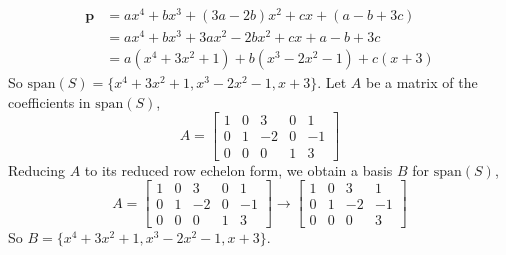 \documentclass{article}
\theoremstyle{definition}
\begin{document}
    \begin{prob}{19} $  $
    	\begin{align*}
    		\mathbf{p} &= ax^4 + bx^3 + (3a-2b)x^2 + cx + (a-b+3c) \\
    		&= ax^4 + bx^3 + 3ax^2 - 2bx^2 + cx + a - b + 3c \\
    		&= a(x^4 + 3x^2 + 1) + b(x^3 - 2x^2 - 1) + c(x+3)
    	\end{align*}
    	So $ \text{span}(S) = \{ x^4+3x^2+1, x^3-2x^2-1, x+3 \} $. Let $ A $ be a matrix of the coefficients in $ \text{span}(S) $,
    	\[
    		A = \begin{bmatrix} 1 & 0 & 3 & 0 & 1 \\ 0 & 1 & -2 & 0 & -1 \\ 0 & 0 & 0 & 1 & 3 \end{bmatrix}
    	\]
    	Reducing $ A $ to its reduced row echelon form, we obtain a basis $ B $ for $ \text{span}(S) $,
    	\[
    		A = \begin{bmatrix} 1 & 0 & 3 & 0 & 1 \\ 0 & 1 & -2 & 0 & -1 \\ 0 & 0 & 0 & 1 & 3 \end{bmatrix} \longrightarrow \begin{bmatrix} 1 & 0 & 3 & 1 \\ 0 & 1 & -2 & -1 \\ 0 & 0 & 0 & 3 \end{bmatrix}
    	\]
    	So $ B = \{ x^4+3x^2+1, x^3-2x^2-1,x+3 \} $.\\
    \end{prob}
    
\end{document}
